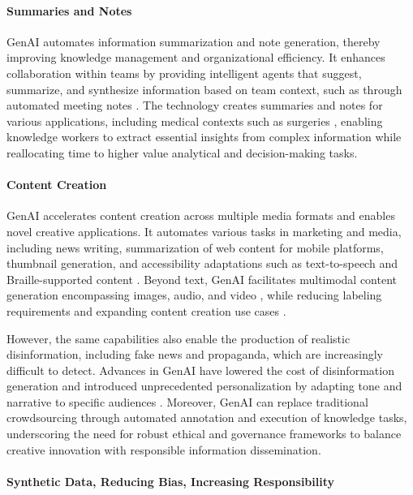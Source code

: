 \paragraph{Summaries and Notes}

GenAI automates information summarization and note generation, thereby improving knowledge management and organizational efficiency. It enhances collaboration within teams by providing intelligent agents that suggest, summarize, and synthesize information based on team context, such as through automated meeting notes \parencite{R04}. The technology creates summaries and notes for various applications, including medical contexts such as surgeries \parencite{S01}, enabling knowledge workers to extract essential insights from complex information while reallocating time to higher value analytical and decision-making tasks.

\paragraph{Content Creation}

GenAI accelerates content creation across multiple media formats and enables novel creative applications. It automates various tasks in marketing and media, including news writing, summarization of web content for mobile platforms, thumbnail generation, and accessibility adaptations such as text-to-speech and Braille-supported content \parencite{R04}. Beyond text, GenAI facilitates multimodal content generation encompassing images, audio, and video \parencite{S18}, while reducing labeling requirements and expanding content creation use cases \parencite{S04,R07}.

However, the same capabilities also enable the production of realistic disinformation, including fake news and propaganda, which are increasingly difficult to detect. Advances in GenAI have lowered the cost of disinformation generation and introduced unprecedented personalization by adapting tone and narrative to specific audiences \parencite{R04}. Moreover, GenAI can replace traditional crowdsourcing through automated annotation and execution of knowledge tasks, underscoring the need for robust ethical and governance frameworks to balance creative innovation with responsible information dissemination.

\paragraph{Synthetic Data, Reducing Bias, Increasing Responsibility}

